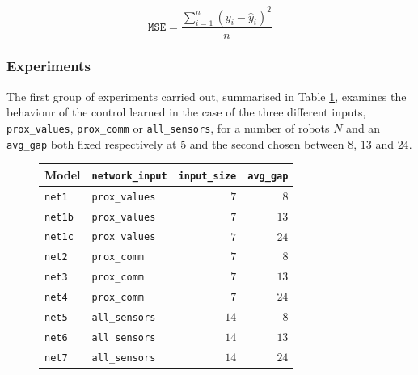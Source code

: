 \begin{Equation}[!htb]
	\centering
	\begin{equation}
	\mathtt{MSE} = \frac{\sum_{i=1}^n (y_i-\hat y_i)^2}{n}
	\end{equation}
	\caption{Mean Squared Error (\gls{mse}) loss function.}
	\label{eq:mse}
\end{Equation}
	

\subsubsection{Experiments}
\label{subsubsec:expdist}

The first group of experiments carried out, summarised in Table 
\ref{tab:modeln5dist}, examines the behaviour of the control learned in the case 
of the three different inputs, \texttt{prox\_values}, \texttt{prox\_comm} or 
\texttt{all\_sensors}, for a number of robots $N$ and an \texttt{avg\_gap} both 
fixed respectively at $5$ and the second chosen between $8$, $13$ and $24$.
\begin{figure}[H]
	\centering
	\begin{tabular}{llrr}
		\toprule
		\textbf{Model} \quad & \textbf{\texttt{network\_input}} & 
		\textbf{\texttt{input\_size}} &
		\textbf{\texttt{avg\_gap}} \\
		\midrule
		\texttt{net1} 				 & \texttt{prox\_values}	&  $  7$  &  $  8$  \\
		\texttt{net1b} 				& \texttt{prox\_values}	   &  $  7$  &  $13$ \\
		\texttt{net1c} 				& \texttt{prox\_values}	   &  $  7$  &  $24$  \\
		\texttt{net2} 				 & \texttt{prox\_comm}	  &  $  7$  &  $  8$  \\
		\texttt{net3} 				 & \texttt{prox\_comm}	  &  $  7$  &  $13$  \\
		\texttt{net4} 				 & \texttt{prox\_comm}	  &  $  7$  &  $24$  \\
		\texttt{net5} 				 & \texttt{all\_sensors}	  &  $14$  &  $  8$  \\
		\texttt{net6} 				 & \texttt{all\_sensors}	  &  $14$  &  $13$ 	\\
		\texttt{net7} 				 & \texttt{all\_sensors}	  &  $14$  &  $24$ 	\\
		\bottomrule
	\end{tabular}
	\label{tab:modeln5dist}
\end{figure}

